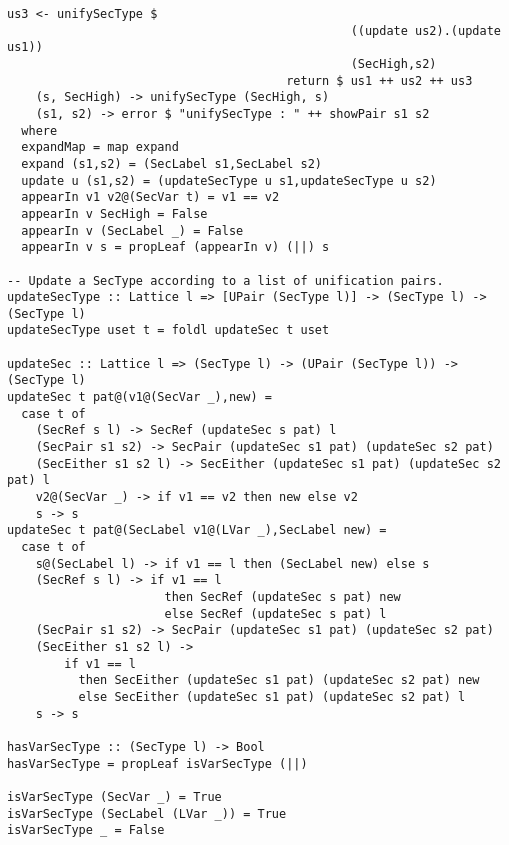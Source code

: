 \begin{Verbatim}[fontsize=\footnotesize,frame=lines,
                 framesep=5mm, label={[Unification.hs]Unification.hs}]
                                       us3 <- unifySecType $ 
                                                ((update us2).(update us1)) 
                                                (SecHigh,s2)
                                       return $ us1 ++ us2 ++ us3 
    (s, SecHigh) -> unifySecType (SecHigh, s)
    (s1, s2) -> error $ "unifySecType : " ++ showPair s1 s2
  where
  expandMap = map expand
  expand (s1,s2) = (SecLabel s1,SecLabel s2)
  update u (s1,s2) = (updateSecType u s1,updateSecType u s2)
  appearIn v1 v2@(SecVar t) = v1 == v2
  appearIn v SecHigh = False
  appearIn v (SecLabel _) = False
  appearIn v s = propLeaf (appearIn v) (||) s
  
-- Update a SecType according to a list of unification pairs. 
updateSecType :: Lattice l => [UPair (SecType l)] -> (SecType l) -> (SecType l)
updateSecType uset t = foldl updateSec t uset

updateSec :: Lattice l => (SecType l) -> (UPair (SecType l)) -> (SecType l)
updateSec t pat@(v1@(SecVar _),new) =
  case t of
    (SecRef s l) -> SecRef (updateSec s pat) l
    (SecPair s1 s2) -> SecPair (updateSec s1 pat) (updateSec s2 pat)
    (SecEither s1 s2 l) -> SecEither (updateSec s1 pat) (updateSec s2 pat) l
    v2@(SecVar _) -> if v1 == v2 then new else v2
    s -> s
updateSec t pat@(SecLabel v1@(LVar _),SecLabel new) =
  case t of
    s@(SecLabel l) -> if v1 == l then (SecLabel new) else s
    (SecRef s l) -> if v1 == l 
                      then SecRef (updateSec s pat) new 
                      else SecRef (updateSec s pat) l
    (SecPair s1 s2) -> SecPair (updateSec s1 pat) (updateSec s2 pat)
    (SecEither s1 s2 l) -> 
        if v1 == l 
          then SecEither (updateSec s1 pat) (updateSec s2 pat) new
          else SecEither (updateSec s1 pat) (updateSec s2 pat) l
    s -> s

hasVarSecType :: (SecType l) -> Bool
hasVarSecType = propLeaf isVarSecType (||) 

isVarSecType (SecVar _) = True
isVarSecType (SecLabel (LVar _)) = True
isVarSecType _ = False
\end{Verbatim}
